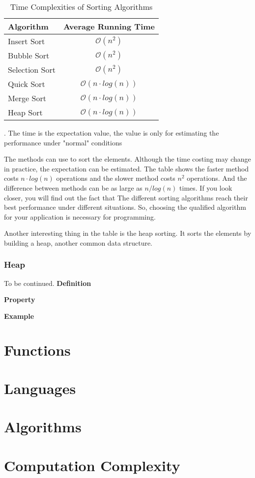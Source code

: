 \begin{table}[htb]
    \centering
    \caption{Time Complexities of Sorting Algorithms}
    \label{Tab: Time Complexities of Sorting Algorithms}
    \begin{tabular}{l|c}
        \hline
        \textbf{Algorithm} & \textbf{Average Running Time} \footnotemark[1] \\
        \hline
        Insert Sort        & $ \mathcal{O}(n^2)     $                       \\
        Bubble Sort        & $ \mathcal{O}(n^2)     $                       \\
        Selection Sort     & $ \mathcal{O}(n^2)     $                       \\
        Quick Sort         & $ \mathcal{O}(n \cdot log(n)) $                \\
        Merge Sort         & $ \mathcal{O}(n \cdot log(n)) $                \\
        Heap Sort          & $ \mathcal{O}(n \cdot log(n)) $                \\
        \hline
    \end{tabular}

    . The time is the expectation value, the value is only for estimating the performance under "normal" conditions
\end{table}

The methods can use to sort the elements.
Although the time costing may change in practice, the expectation can be estimated.
The table shows the faster method costs $n \cdot log(n)$ operations and the slower method costs $n ^ 2$ operations.
And the difference between methods can be as large as $n / log(n)$ times.
If you look closer, you will find out the fact that
The different sorting algorithms reach their best performance under different situations.
So, choosing the qualified algorithm for your application is necessary for programming.

Another interesting thing in the table is the heap sorting.
It sorts the elements by building a heap, another common data structure.

\subsubsection{Heap}

To be continued.
\textbf{Definition}

\textbf{Property}

\textbf{Example}

\section{Functions}

\section{Languages}

\section{Algorithms}

\appendix

\section{Computation Complexity}

